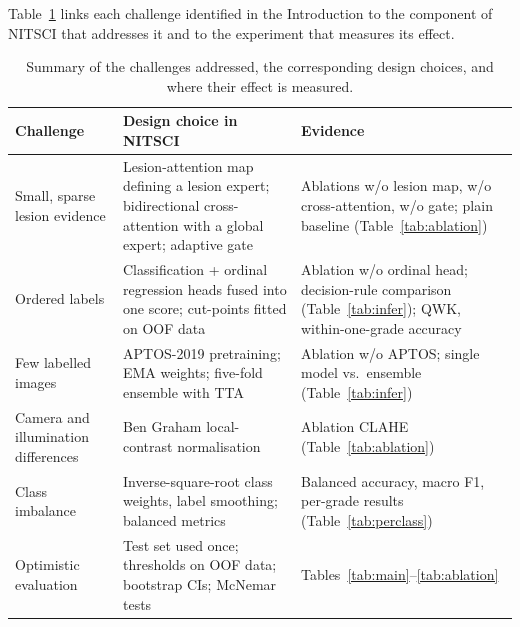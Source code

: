 Table~\ref{tab:summary} links each challenge identified in the Introduction to the component of NITSCI that
addresses it and to the experiment that measures its effect.

\begin{table}[!htbp]
\centering\small
\caption{Summary of the challenges addressed, the corresponding design choices, and where their effect is measured.}
\label{tab:summary}
\begin{tabularx}{\linewidth}{@{}>{\raggedright\arraybackslash}p{3.3cm}>{\raggedright\arraybackslash}X>{\raggedright\arraybackslash}p{3.5cm}@{}}
\toprule
Challenge & Design choice in NITSCI & Evidence\\
\midrule
Small, sparse lesion evidence & Lesion-attention map defining a lesion expert; bidirectional cross-attention with a
  global expert; adaptive gate & Ablations w/o lesion map, w/o cross-attention, w/o gate; plain baseline
  (Table~\ref{tab:ablation})\\
Ordered labels & Classification + ordinal regression heads fused into one score; cut-points fitted on OOF data &
  Ablation w/o ordinal head; decision-rule comparison (Table~\ref{tab:infer}); QWK, within-one-grade accuracy\\
Few labelled images & APTOS-2019 pretraining; EMA weights; five-fold ensemble with TTA & Ablation w/o APTOS;
  single model vs.\ ensemble (Table~\ref{tab:infer})\\
Camera and illumination differences & Ben Graham local-contrast normalisation & Ablation CLAHE
  (Table~\ref{tab:ablation})\\
Class imbalance & Inverse-square-root class weights, label smoothing; balanced metrics & Balanced accuracy, macro F1,
  per-grade results (Table~\ref{tab:perclass})\\
Optimistic evaluation & Test set used once; thresholds on OOF data; bootstrap CIs; McNemar tests &
  Tables~\ref{tab:main}--\ref{tab:ablation}\\
\bottomrule
\end{tabularx}
\end{table}

